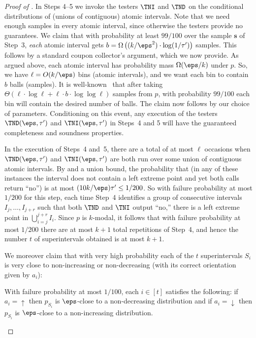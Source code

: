 \begin{proof}[Proof of ]
In Steps 4--5 we invoke the testers $\TNI$ and $\TND$ on
the conditional distributions of (unions of contiguous) atomic intervals.
Note that we need enough samples in every atomic interval, since otherwise
the testers provide no guarantees. We claim that with probability at least
$99/100$ over the sample $\mathbf{s}$ of Step~3, \emph{each} atomic interval gets
$b = \Omega \left( {(k/\eps^2)} \cdot \log(1/\tau') \right)$ samples.
This follows by a standard coupon collector's argument, which we now provide.
As argued above, each atomic interval has probability mass $\Omega(\eps/k)$ under $p$.
So, we have $\ell = O(k/\eps)$ bins (atomic intervals), and we want each bin
to contain $b$ balls (samples). It is well-known~\cite{NS:60} that after taking
$\Theta(\ell \cdot \log \ell + \ell \cdot b \cdot \log \log \ell)$ samples from $p$,
with probability $99/100$ each bin will contain the desired number of balls.
The claim now follows by our choice of parameters. Conditioning on this event,
any execution of the testers $\TND(\eps,\tau')$ and $\TNI(\eps,\tau')$ 
in Steps~4 and 5 will have the guaranteed completeness and soundness properties.

In the execution of Steps~4 and~5, there are a total of at most
$\ell$ occasions when $\TND(\eps,\tau')$ and $\TNI(\eps,\tau')$
are both run over some union of contiguous atomic intervals.
By  and a union bound,
the probability that (in any of these instances the interval does not
contain a left extreme point and yet both calls return ``no'') is at
most $(10k/\eps)\tau' \leq 1/200$.  So with failure probability at most $1/200$ for this
step, each time Step~4 identifies a group of
consecutive intervals $I_{j},\dots,I_{j+r}$ such that both $\TND$ and
$\TNI$ output ``no,'' there is a left extreme point in $\bigcup_{i=j}^{j+r} I_i$.
Since $p$ is $k$-modal, it follows that with failure probability at
most $1/200$ there are at most $k+1$ total repetitions of
Step~4, and hence the number $t$ of superintervals obtained is at most $k+1$.

We moreover claim that with very high probability each of the $t$
superintervals $S_i$ is very close to non-increasing or non-decreasing (with
its correct orientation given by $a_i$):
%
\begin{claim} \label{claim:Siisright}
With failure probability at most $1/100$, each $i \in [t]$ satisfies the
following:  if $a_i=\uparrow$ then $p_{S_i}$ is $\eps$-close to a non-decreasing
distribution and if $a_i=\downarrow$ then $p_{S_i}$ is $\eps$-close to a non-increasing
distribution.
\end{claim}


\end{proof}
